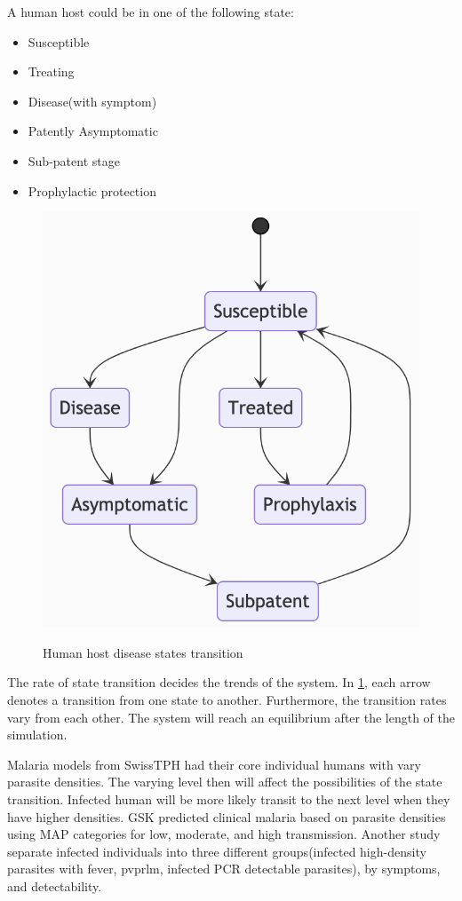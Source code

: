 \documentclass[a4paper, 12pt, twoside]{report}
\begin{document}
A human host could be in one of the following state:
\begin{itemize}
	\item Susceptible
	\item Treating
	\item Disease(with symptom)
	\item Patently Asymptomatic
	\item Sub-patent stage
	\item Prophylactic protection
\end{itemize}

\begin{figure}[t]
	\centering
	\includegraphics[keepaspectratio=true, scale=0.8]{images/disease-state-transition-diagram.png}
	\label{fig:human_state}
	\caption{Human host disease states transition}
\end{figure}

The rate of state transition decides the trends of the system.
In \ref{fig:human_state}, each arrow denotes a transition from one state to another.
Furthermore, the transition rates vary from each other.
The system will reach an equilibrium after the length of the simulation.

Malaria models from SwissTPH had their core individual humans with vary parasite densities.
The varying level then will affect the possibilities of the state transition.
Infected human will be more likely transit to the next level when they have higher densities.
GSK predicted clinical malaria based on parasite densities using MAP categories for low, moderate, and high transmission.\cite{Hay2004}
Another study separate infected individuals into three different groups(infected high-density parasites with fever, \gls{pvprlm}, infected PCR detectable parasites)\cite{White2018b}, by symptoms, and detectability.
\end{document}
